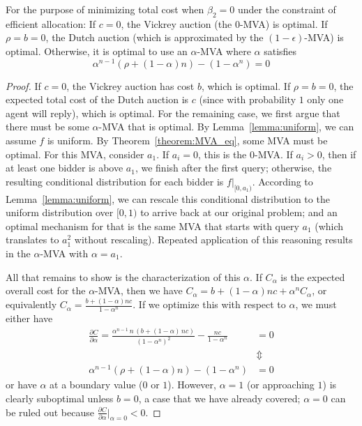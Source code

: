\begin{proposition}
For the purpose of minimizing total cost when $\beta_2=0$ under the constraint of efficient allocation:
If $c = 0$, the Vickrey auction (the $0$-MVA) is optimal.
If $\rho = b = 0$, the Dutch auction (which is approximated by the
$(1-\epsilon)$-MVA) is optimal.  
Otherwise, it is optimal to use an $\alpha$-MVA where $\alpha$ satisfies
$$\alpha^{n-1} (\rho + (1-\alpha)n) - (1-\alpha^n) = 0$$
\end{proposition}
\begin{proof}
If $c=0$, the Vickrey auction has cost $b$, which is optimal.
If $\rho=b=0$, the expected total cost of the Dutch auction is $c$ (since
with probability $1$ only one agent will reply), which is optimal.
For the remaining case, we first argue that there must be some $\alpha$-MVA
that is optimal.  
By  Lemma~\ref{lemma:uniform}, we can assume $f$ is uniform.
By Theorem~\ref{theorem:MVA_eq}, some MVA must be
optimal.  For this MVA, consider $a_1$.  If $a_i=0$, this is the
$0$-MVA. If $a_i>0$, then if at least one bidder is above $a_1$, we finish after
the first query; otherwise, the resulting conditional distribution for each
bidder is $f|_{[0,a_1)}$. According to Lemma~\ref{lemma:uniform}, we can
rescale this conditional distribution to the uniform distribution over
$[0,1)$ to arrive back at our original problem; and an optimal mechanism
for that is the same MVA that starts with query $a_1$ (which translates to
$a_1^2$ without rescaling).  Repeated application of this reasoning results
in the $\alpha$-MVA with $\alpha=a_1$.

All that remains to show is the characterization of this $\alpha$.
If $C_\alpha$ is the expected overall cost for the $\alpha$-MVA, then we
have $C_\alpha = b + (1-\alpha)nc + \alpha^n C_\alpha$, or equivalently 
$C_\alpha = \frac{b+(1-\alpha)nc }{ 1-\alpha^n}$.
If we optimize this with respect to $\alpha$, we must either have
\begin{align}\label{eq:alpha}
\frac{\partial C}{\partial \alpha} = \frac{{\alpha}^{n-1}\,n\,\left(
b+\left( 1-\alpha\right) \,nc\right) }{{\left( 1-{\alpha}^{n}\right)
}^{2}}-\frac{nc}{1-{\alpha}^{n}} &= 0 \nonumber\\
&\Updownarrow\nonumber\\
\alpha^{n-1} (\rho + (1-\alpha)n) - (1-\alpha^n) &= 0
\end{align}
or have $\alpha$ at a boundary value ($0$ or $1$). However, $\alpha=1$ (or
approaching $1$) is clearly suboptimal unless $b=0$, a case that we have
already covered; $\alpha=0$ can be ruled out because $\frac{\partial
  C}{\partial \alpha} |_{\alpha = 0} < 0$.
\end{proof}


